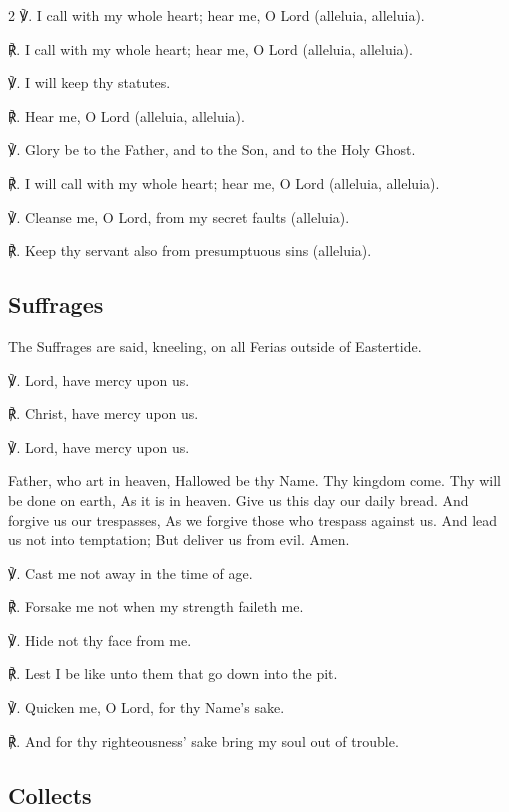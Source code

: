 \begin{multicols}{2}
℣. I call with my whole heart; hear me, O Lord (alleluia, alleluia).

℟. I call with my whole heart; hear me, O Lord (alleluia, alleluia).

℣. I will keep thy statutes.

℟. Hear me, O Lord (alleluia, alleluia).

℣. Glory be to the Father, and to the Son, and to the Holy Ghost.

℟. I will call with my whole heart; hear me, O Lord (alleluia, alleluia).

℣. Cleanse me, O Lord, from my secret faults (alleluia).

℟. Keep thy servant also from presumptuous sins (alleluia).

\vspace{-0.75\baselineskip}

\subsection{Suffrages}

\vspace{-0.25\baselineskip}

\begin{rubric}
	The Suffrages are said, kneeling, on all Ferias outside of Eastertide.
\end{rubric}

℣. Lord, have mercy upon us.

℟. Christ, have mercy upon us.

℣. Lord, have mercy upon us.

 Father, who art in heaven, Hallowed be thy Name. Thy kingdom come. Thy will be done on earth, As it is in heaven. Give us this day our daily bread. And forgive us our trespasses, As we forgive those who trespass against us. And lead us not into temptation; But deliver us from evil. Amen.

℣. Cast me not away in the time of age.

℟. Forsake me not when my strength faileth me.

℣. Hide not thy face from me.

℟. Lest I be like unto them that go down into the pit.

℣. Quicken me, O Lord, for thy Name's sake.

℟. And for thy righteousness' sake bring my soul out of trouble.

\subsection{Collects}


\end{multicols}
